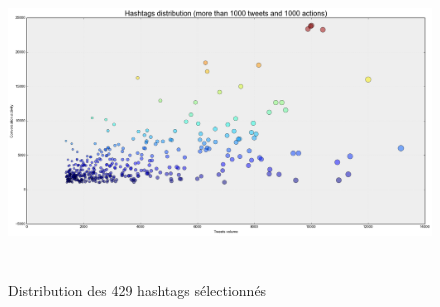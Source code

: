 \begin{figure}
    \centering
    \includegraphics[width=6.0114in,height=3.2114in]{figures/chap3/chapitre3-img8.png}
    \caption{Distribution des 429 hashtags s\'electionn\'es }
\end{figure}


